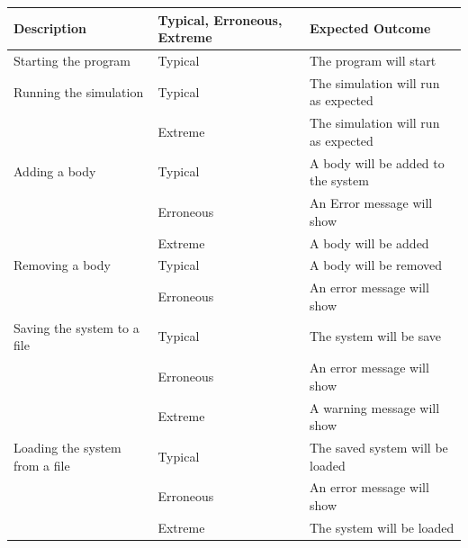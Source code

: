 \begin{tabular}{p{}p{}p{}} 
	Description & Typical, Erroneous, Extreme & Expected Outcome \\ \hline
	Starting the program & Typical & The program will start \\ 
	Running the simulation & Typical & The simulation will run as expected
	\\
	 & Extreme & The simulation will run as expected \\
	Adding a body & Typical & A body will be added to the system \\
	 & Erroneous & An Error message will show \\
	 & Extreme & A body will be added \\
	Removing a body & Typical & A body will be removed \\
	 & Erroneous & An error message will show \\
	Saving the system to a file & Typical & The system will be save \\
	 & Erroneous & An error message will show \\
	 & Extreme & A warning message will show \\
	Loading the system from a file & Typical & The saved system will be
	loaded \\
	 & Erroneous & An error message will show \\
	 & Extreme & The system will be loaded \\
		
\end{tabular}
